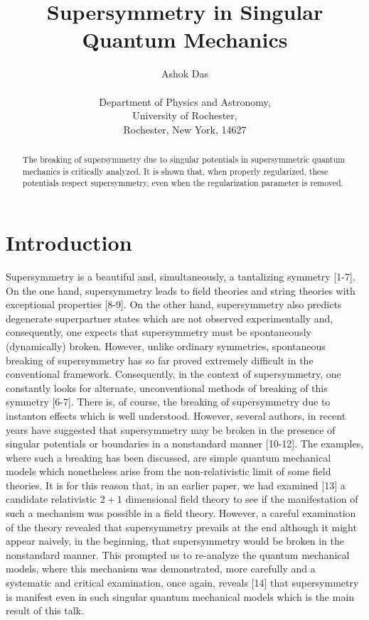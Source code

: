 \documentclass[a4paper,11pt]{article}
\begin{document}
  


\title{ 
{\bf Supersymmetry in Singular Quantum Mechanics}}
\author{Ashok Das \\
\\
Department of Physics and Astronomy, \\
University of Rochester,\\
Rochester, New York, 14627}
\date{}
\maketitle


\begin{abstract}
The breaking of supersymmetry due to singular potentials
in supersymmetric quantum mechanics is critically analyzed. It
is shown that, when properly regularized, these potentials
respect supersymmetry, even when the regularization parameter is removed. 
\end{abstract}

\section{Introduction}

Supersymmetry is a beautiful and, simultaneously, a tantalizing
symmetry [1-7]. On the one hand, supersymmetry leads to field theories and
string theories with exceptional properties [8-9]. On the other hand,
supersymmetry also predicts degenerate superpartner states which are
not  observed experimentally and, consequently, one expects
that supersymmetry must be spontaneously (dynamically)
broken. However, unlike ordinary symmetries, spontaneous breaking of
supersymmetry has so far proved extremely difficult in the
conventional framework. Consequently, in the context of supersymmetry,
one constantly looks for alternate, unconventional methods of breaking
of this symmetry [6-7]. There is, of course, the breaking of supersymmetry
due to instanton effects which is well understood. However, several
authors, in recent years have suggested that supersymmetry may be
broken in the presence of singular potentials or boundaries in a
nonstandard manner [10-12]. 
The examples, where such a breaking has been discussed, are simple
quantum mechanical models which nonetheless arise from the
non-relativistic limit of some field theories. It is for this reason
that, in an earlier paper, we had examined [13] a candidate relativistic
$2+1$ dimensional field theory to see if the manifestation of such a
mechanism was possible in a field theory. However, a careful
examination  of the theory revealed that
supersymmetry prevails at the end although  it might appear naively, in
the beginning, that  supersymmetry would be broken in the nonstandard
manner. This prompted us to re-analyze the quantum mechanical models,
where this mechanism was demonstrated, more carefully and a
systematic and  critical examination,
once again, reveals [14] that  supersymmetry is
manifest even in such singular quantum mechanical models which is the
main result of this talk.
\end{document}
